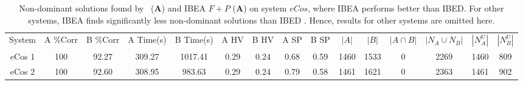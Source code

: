 \begin{table*}[htbp]
  \centering
    \vspace{-1mm}
  \scriptsize
  \caption{Non-dominant solutions found by \ourSol~(\textbf{A}) and  IBEA  $F+P$ (\textbf{A}) on  system  $eCos$, where IBEA performs better than IBED. For other systems, IBEA finds significantly less non-dominant solutions than IBED \cite{DBLP:journals/asc/XueZT0CC016}. Hence, results for other systems are omitted here.}
    \begin{tabular}{|c|c|c|c|c|c|c|c|c|c|c|c|c|c|c|}
    \Xhline{2\arrayrulewidth}
    System & A \%Corr & B \%Corr & A Time(s) & B Time(s) &A HV & B HV & A SP & B SP & $|A|$ & $|B|$ & $|A \cap B|$ & \textbf{$|N_A \cup N_B|$} & \textbf{$|N^{U}_A|$} & \textbf{$|N^{U}_B|$} \bigstrut\\
   \Xhline{2\arrayrulewidth}
    eCos 1 & 100   & 92.27  & 309.27  & 1017.41  & 0.29  & 0.24  & 0.68  & 0.59  & 1460  & 1533  & 0     & 2269  & 1460  & 809 \bigstrut\\
    \hline
    eCos 2 & 100   & 92.60  & 308.95  & 983.63  & 0.29  & 0.24  & 0.79  & 0.58  & 1461  & 1621  & 0     & 2363  & 1461  & 902 \bigstrut\\
    \hline
    \end{tabular}%
  \label{tab:ourSolVSibea}%
\vspace{-3mm}
\end{table*}%
